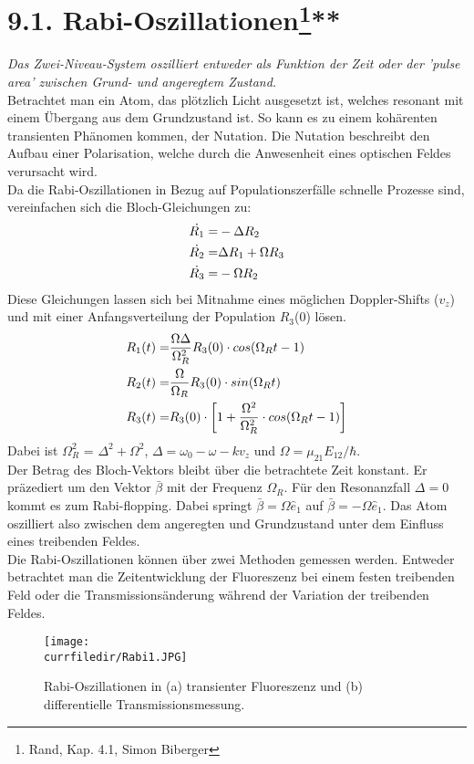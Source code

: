 \section{9.1. Rabi-Oszillationen\protect\footnote{Rand, Kap. 4.1, Simon Biberger}\hfill ***} 

\textit{Das Zwei-Niveau-System oszilliert entweder als Funktion der
Zeit oder der 'pulse area' zwischen Grund- und angeregtem
Zustand.}\\
Betrachtet man ein Atom, das plötzlich Licht ausgesetzt ist, welches resonant mit einem Übergang aus dem Grundzustand ist. So kann es zu einem kohärenten transienten Phänomen kommen, der Nutation. Die Nutation beschreibt den Aufbau einer Polarisation, welche durch die Anwesenheit eines optischen Feldes verursacht wird.\\
Da die Rabi-Oszillationen in Bezug auf Populationszerfälle schnelle Prozesse sind, vereinfachen sich die Bloch-Gleichungen zu:
\begin{align}
    \dot{R_1} =& -\Delta R_2  \notag \\
    \dot{R_2} =& \Delta R_1 + \Omega R_3 \label{Rabi}\\
    \dot{R_3} =& - \Omega R_2 \notag
 \end{align}
Diese Gleichungen lassen sich bei Mitnahme eines möglichen Doppler-Shifts ($v_z$) und mit einer Anfangsverteilung der Population $R_3$(0) lösen.
\begin{align}
    R_1(t) =& \frac{\Omega \Delta}{\Omega_R^2}R_3(0)\cdot cos(\Omega_Rt-1) \notag \\
    R_2(t) =& \frac{\Omega}{\Omega_R}R_3(0)\cdot sin(\Omega_Rt) \label{Rabi2}\\
    R_3(t) =& R_3(0)\cdot \left[1+\frac{\Omega^2}{\Omega_R^2}\cdot 
    cos(\Omega_Rt-1)\right] \notag
\end{align}
Dabei ist $\Omega_R^2$ = $\Delta^2 + \Omega^2$, $\Delta = \omega_0-\omega-kv_z$ und $\Omega = \mu_{21}E_{12}/\hbar$.\\
Der Betrag des Bloch-Vektors bleibt über die betrachtete Zeit konstant. Er präzediert um den Vektor $\bar{\beta}$ mit der Frequenz $\Omega_R$.
Für den Resonanzfall $\Delta = 0$ kommt es zum Rabi-flopping. Dabei springt  $\bar{\beta} = \Omega \hat{e}_1$ auf $\bar{\beta} = -\Omega \hat{e}_1$. Das Atom oszilliert also zwischen dem angeregten und Grundzustand unter dem Einfluss eines treibenden Feldes.\\
Die Rabi-Oszillationen können über zwei Methoden gemessen werden. Entweder betrachtet man die Zeitentwicklung der Fluoreszenz bei einem festen treibenden Feld oder die Transmissionsänderung während der Variation der treibenden Feldes.
\begin{figure} [h]
    \centering
    \texttt{[image: \\currfiledir/Rabi1.JPG]}
    \caption{Rabi-Oszillationen in (a) transienter Fluoreszenz und (b) differentielle Transmissionsmessung.}
    \label{fig:Rabi}
\end{figure}


